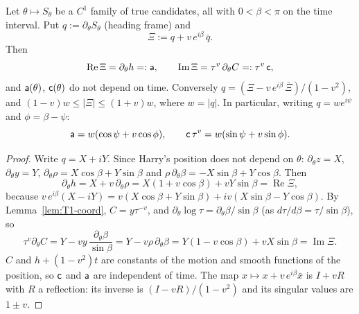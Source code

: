 \begin{lemma}\label{lem:T1-first}
Let $\theta\mapsto S_\theta$ be a $C^1$ family of true candidates, all with $0<\beta<\pi$ on the time interval. Put
$q:=\partial_\theta S_\theta$ (heading frame) and
\[
\Xi:=q+v\,e^{i\beta}\,\bar q .
\]
Then
\[
\operatorname{Re}\Xi=\partial_\theta h=:\mathsf a,\qquad\operatorname{Im}\Xi=\tau^v\,\partial_\theta C=:\tau^v\,\mathsf c,
\]
and $\mathsf a(\theta)$, $\mathsf c(\theta)$ do not depend on time. Conversely $q=(\Xi-v\,e^{i\beta}\,\bar\Xi)/(1-v^2)$, and
$(1-v)w\le|\Xi|\le(1+v)w$, where $w=|q|$. In particular, writing $q=we^{i\psi}$ and $\phi=\beta-\psi$:
\[
\mathsf a=w(\cos\psi+v\cos\phi),\qquad\mathsf c\,\tau^v=w(\sin\psi+v\sin\phi).
\]
\end{lemma}
\begin{proof}
Write $q=X+iY$. Since Harry's position does not depend on $\theta$: $\partial_\theta z=X$, $\partial_\theta y=Y$,
$\partial_\theta\rho=X\cos\beta+Y\sin\beta$ and $\rho\,\partial_\theta\beta=-X\sin\beta+Y\cos\beta$. Then
\[
\partial_\theta h=X+v\,\partial_\theta\rho=X(1+v\cos\beta)+vY\sin\beta=\operatorname{Re}\Xi,
\]
because $v\,e^{i\beta}(X-iY)=v(X\cos\beta+Y\sin\beta)+iv(X\sin\beta-Y\cos\beta)$. By Lemma~\ref{lem:T1-coord}, $C=y\tau^{-v}$, and
$\partial_\theta\log\tau=\partial_\theta\beta/\sin\beta$ (as $d\tau/d\beta=\tau/\sin\beta$), so
\[
\tau^v\partial_\theta C=Y-vy\,\frac{\partial_\theta\beta}{\sin\beta}=Y-v\rho\,\partial_\theta\beta=Y(1-v\cos\beta)+vX\sin\beta=\operatorname{Im}\Xi .
\]
$C$ and $h+(1-v^2)t$ are constants of the motion and smooth functions of the position, so $\mathsf c$ and $\mathsf a$ are independent of time.
The map $x\mapsto x+v\,e^{i\beta}\bar x$ is $I+vR$ with $R$ a reflection: its inverse is $(I-vR)/(1-v^2)$ and its singular values are
$1\pm v$.
\end{proof}

